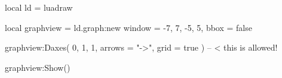 \documentclass[border = 3pt]{standalone}
\begin{document}
\begin{luadraw}{}
local ld = luadraw

local graphview = ld.graph:new{
  window = {-7, 7, -5, 5},
  bbox   = false
}

graphview:Daxes(
  {0, 1, 1},
  {
    arrows = "->",
    grid   = true
  } )  -- < this is allowed!

graphview:Show()
\end{luadraw}
\end{document}
